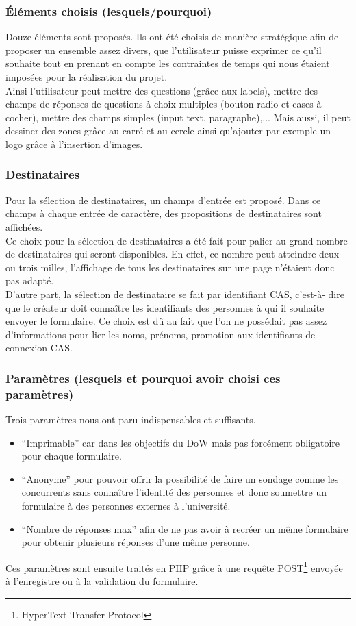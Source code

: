 \documentclass{sigplanconf}
\begin{document}
\subsubsection{Éléments choisis (lesquels/pourquoi)}
Douze éléments sont proposés. Ils ont été choisis de manière stratégique afin de proposer un ensemble assez divers, que l’utilisateur puisse exprimer ce qu’il souhaite tout en prenant en compte les contraintes de temps qui nous étaient imposées pour la réalisation du projet.\\
Ainsi l’utilisateur peut mettre des questions (grâce aux labels), mettre des champs de réponses de questions à choix multiples (bouton radio et cases à cocher), mettre des champs simples (input text, paragraphe),... Mais aussi, il peut dessiner des zones grâce au carré et au cercle ainsi qu’ajouter par exemple un logo grâce à l’insertion d’images.

\subsubsection{Destinataires}
Pour la sélection de destinataires, un champs d’entrée est proposé. Dans ce champs à chaque entrée de caractère, des propositions de destinataires sont affichées.\\
Ce choix pour la sélection de destinataires a été fait pour palier au grand nombre de destinataires qui seront disponibles. En effet, ce nombre peut atteindre deux ou trois milles, l’affichage de tous les destinataires sur une page n’étaient donc pas adapté.\\
D’autre part, la sélection de destinataire se fait par identifiant CAS, c’est-à- dire que le créateur doit connaître les identifiants des personnes à qui il souhaite envoyer le formulaire. Ce choix est dû au fait que l’on ne possédait pas assez d’informations pour lier les noms, prénoms, promotion aux identifiants de connexion CAS.

\subsubsection{Paramètres (lesquels et pourquoi avoir choisi ces paramètres)}
Trois paramètres nous ont paru indispensables et suffisants. 
\begin{itemize}
\item “Imprimable” car dans les objectifs du DoW mais pas forcément obligatoire pour chaque formulaire.
\item “Anonyme” pour pouvoir offrir la possibilité de faire un sondage comme les concurrents sans connaître l’identité des personnes et donc soumettre un formulaire à des personnes externes à l’université.
\item “Nombre de réponses max” afin de ne pas avoir à recréer un même formulaire pour obtenir plusieurs réponses d’une même personne.
\end{itemize}
Ces paramètres sont ensuite traités en PHP grâce à une requête POST\footnote{HyperText Transfer Protocol} envoyée à l’enregistre ou à la validation du formulaire.
\end{document}
